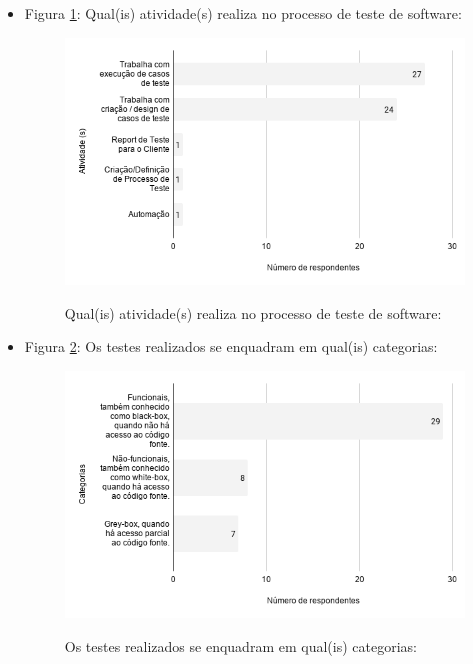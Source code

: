 \begin{itemize}
    
    \item Figura \ref{figure:s_atividadesprojeto}: Qual(is) atividade(s) realiza no processo de teste de software:
        \begin{figure}[!htb]
        \centering
        \includegraphics[width=.80\textwidth]{images/s_atividadesprojeto.png}
        \label{figure:s_atividadesprojeto}
        \caption{Qual(is) atividade(s) realiza no processo de teste de software:}
            \end{figure}   
    
    
    \item Figura \ref{figure:s_categoriastestes}: Os testes realizados se enquadram em qual(is) categorias:
        \begin{figure}[!htb]
        \centering
        \includegraphics[width=.80\textwidth]{images/s_categoriastestes.png}
        \label{figure:s_categoriastestes}
        \caption{Os testes realizados se enquadram em qual(is) categorias:}
        \end{figure}       
    

\end{itemize}

